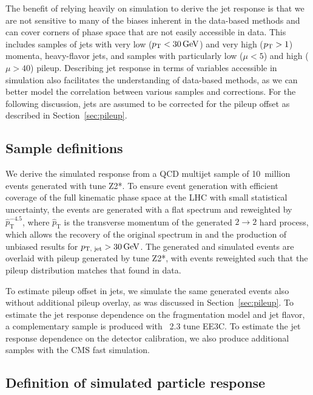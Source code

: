 \documentclass[11pt,twoside,a4paper,cmspaper,final,collab]{cms-tdr}
\begin{document}
The benefit of relying heavily on simulation to derive the jet response is that we are not sensitive to many of the biases inherent in the data-based methods and can cover corners of phase space that are not easily accessible in data.
This includes samples of jets with very low ($p_{\mathrm{T}}<30\,\text{Ge\hspace{-.08em}V}$) and very high ($p_{\mathrm{T}}>1$\TeV) momenta,
heavy-flavor jets, and samples with particularly low ($\mu<5$) and high ($\mu>40$) pileup. Describing jet response in terms of variables accessible in simulation also facilitates the understanding of data-based methods, as we can better model the correlation between various samples and corrections.
For the following discussion, jets are assumed to be corrected for the pileup offset as described in Section~\ref{sec:pileup}.

\subsection*{Sample definitions}

We derive the simulated response from a QCD multijet sample of 10~million events generated with  tune Z2*.
To ensure event generation with efficient coverage of the full kinematic phase space at the LHC with small statistical uncertainty,
the events are generated with a flat \pt spectrum and reweighted by $\hat{p}_\mathrm{T}^{-4.5}$, where $\hat{p}_\mathrm{T}$ is the transverse momentum of the generated $2 \to 2$ hard process, which allows the recovery of the original \pt spectrum
in  and the production of unbiased results for $p_\text{T, jet}>30\,\text{Ge\hspace{-.08em}V}$.
The generated and simulated events are overlaid with pileup generated by  tune Z2*, with events reweighted such that the pileup distribution matches that found in data.

To estimate pileup offset in jets,
we simulate the same generated events also without additional pileup overlay, as was discussed in Section~\ref{sec:pileup}.
To estimate the jet response dependence on the fragmentation model and jet flavor, a complementary sample is produced with \HERWIGpp~2.3 tune EE3C.
To estimate the jet response dependence on the detector calibration, we also produce additional samples with the CMS fast simulation.

\subsection*{Definition of simulated particle response}
\end{document}
